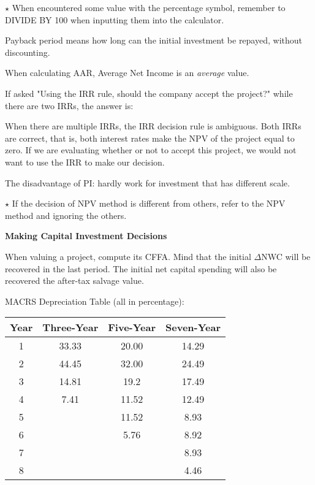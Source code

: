 \documentclass{article}
\newcommand{\bigtitle}[1]{
	\noindent
	\textbf{#1}
}
\begin{document}
\color{red}
$\star$ When encountered some value with the percentage symbol, remember to DIVIDE BY 100 when inputting them into the calculator.
\color{black}

Payback period means how long can the initial investment be repayed, without discounting.

When calculating AAR, Average Net Income is an \textit{average} value. 

If asked "Using the IRR rule, should the company accept the project?" while there are two IRRs, the answer is:

When there are multiple IRRs, the IRR decision rule is ambiguous. Both IRRs are correct, that is, both interest rates make the NPV of the project equal to zero. If we are evaluating whether or not to accept this project, we would not want to use the IRR to make our decision.

The disadvantage of PI: hardly work for investment that has different scale.

$\star$ If the decision of NPV method is different from others, refer to the NPV method and ignoring the others.

\clearpage


\bigtitle{Making Capital Investment Decisions}

When valuing a project, compute its CFFA. Mind that the initial $\Delta$NWC will be recovered in the last period.
The initial net capital spending will also be recovered the after-tax salvage value.

MACRS Depreciation Table (all in percentage):


\begin{table}[htb]
	\vspace{-1em}
	\centering
	\begin{tabular}{cccc}
		Year & Three-Year & Five-Year & Seven-Year \\\hline
		1    & 33.33      & 20.00     & 14.29      \\
		2    & 44.45      & 32.00     & 24.49      \\
		3    & 14.81      & 19.2      & 17.49      \\
		4    & 7.41       & 11.52     & 12.49      \\
		5    &            & 11.52     & 8.93       \\
		6    &            & 5.76      & 8.92       \\
		7    &            &           & 8.93       \\
		8    &            &           & 4.46      
	\end{tabular}
\vspace{-1em}
\end{table}
\end{document}
